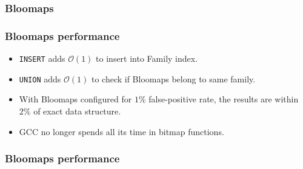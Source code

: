 \documentclass{beamer}
\renewcommand{\O}{\mathcal{O}}
\begin{document}
\begin{frame}[t]
\frametitle{Bloomaps}




\end{frame}

\begin{frame}[t]
\frametitle{Bloomaps performance}
	\begin{itemize}
		\item {\tt INSERT} adds $\O(1)$ to insert into Family index.
		\item {\tt UNION} adds $\O(1)$ to check if Bloomaps belong to same
			family.
		\item With Bloomaps configured for $1\%$ false-positive rate, the
			results are within $2\%$ of exact data structure.
		\item GCC no longer spends all its time in bitmap functions.
	\end{itemize}
\end{frame}

\begin{frame}[t]
\frametitle{Bloomaps performance}
\end{frame}
\end{document}
